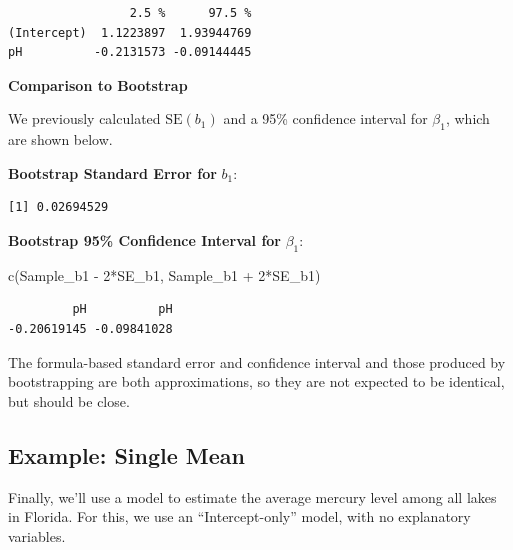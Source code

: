 \documentclass[
  letterpaper,
  DIV=11,
  numbers=noendperiod]{scrreprt}
\newenvironment{Shaded}{\begin{snugshade}}{\end{snugshade}}
\newcommand{\DecValTok}[1]{\textcolor[rgb]{0.68,0.00,0.00}{#1}}
\newcommand{\FunctionTok}[1]{\textcolor[rgb]{0.28,0.35,0.67}{#1}}
\newcommand{\NormalTok}[1]{\textcolor[rgb]{0.00,0.23,0.31}{#1}}
\newcommand{\OtherTok}[1]{\textcolor[rgb]{0.00,0.23,0.31}{#1}}
\newcommand{\SpecialCharTok}[1]{\textcolor[rgb]{0.37,0.37,0.37}{#1}}
\begin{document}
\begin{verbatim}
                 2.5 %      97.5 %
(Intercept)  1.1223897  1.93944769
pH          -0.2131573 -0.09144445
\end{verbatim}

\textbf{Comparison to Bootstrap}

We previously calculated \(\text{SE}(b_1)\) and a 95\% confidence
interval for \(\beta_1\), which are shown below.

\textbf{Bootstrap Standard Error for} \(b_1\):

\begin{Shaded}
\end{Shaded}

\begin{verbatim}
[1] 0.02694529
\end{verbatim}

\textbf{Bootstrap 95\% Confidence Interval for} \(\beta_1\):

\begin{Shaded}
\begin{Highlighting}[]
\FunctionTok{c}\NormalTok{(Sample\_b1 }\SpecialCharTok{{-}} \DecValTok{2}\SpecialCharTok{*}\NormalTok{SE\_b1, Sample\_b1 }\SpecialCharTok{+} \DecValTok{2}\SpecialCharTok{*}\NormalTok{SE\_b1) }
\end{Highlighting}
\end{Shaded}

\begin{verbatim}
         pH          pH 
-0.20619145 -0.09841028 
\end{verbatim}

The formula-based standard error and confidence interval and those
produced by bootstrapping are both approximations, so they are not
expected to be identical, but should be close.

\subsection{Example: Single Mean}\label{example-single-mean}

Finally, we'll use a model to estimate the average mercury level among
all lakes in Florida. For this, we use an ``Intercept-only'' model, with
no explanatory variables.
\end{document}
